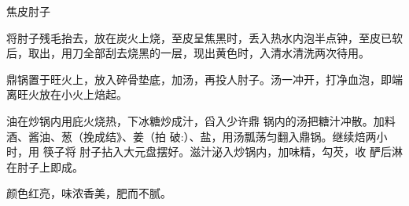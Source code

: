 \begin{recipe}{焦皮肘子}

\ingredients


\cooking

\step 将肘子残毛抬去，放在炭火上烧，至皮呈焦黑时，丢入热水内泡半点钟，至皮已软
后，取出，用刀全部刮去烧黑的一层，现出黄色时，入清水清洗两次待用。

\step 鼎锅置于旺火上，放入碎骨垫底，加汤，再投人肘子。汤一冲开，打净血泡，即端
离旺火放在小火上焙起。

\step 油在炒锅内用庇火烧热，下冰糖炒成汁，舀入少许鼎 锅内的汤把糖汁冲散。加料
酒、酱油、葱（挽成结》、姜（拍 破:）、盐，用汤瓢荡匀翻入鼎锅。继续焙两小时，用
筷子将 肘子拈入大元盘摆好。滋汁泌入炒锅内，加味精，勾芡，收 酽后淋在肘子上即成。

\features

颜色红亮，味浓香美，肥而不腻。

\end{recipe}

